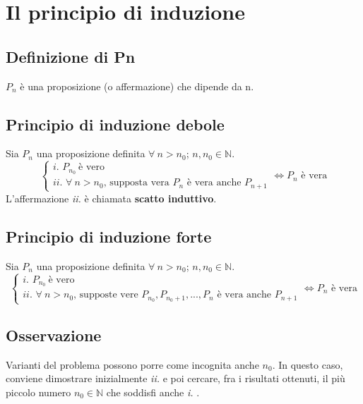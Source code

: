 \chapter{Il principio di induzione}
\section{Definizione di Pn}
$P_n$ è una proposizione (o affermazione) che dipende da n.

\section{Principio di induzione debole}
Sia $P_n$ una proposizione definita $\forall\ n>n_0$;  $n,n_0 \in \mathbb{N}$.
\begin{equation}
\begin{cases}
\textit{i. }P_{n_0}\ \text{è vero}\\
\textit{ii. }\forall\ n>n_0 \text{, supposta vera } P_n \text{ è vera anche } P_{n+1}
\end{cases} \iff P_n \text{ è vera}
\end{equation}
L'affermazione \textit{ii.} è chiamata \textbf{scatto induttivo}.

\section{Principio di induzione forte}
Sia $P_n$ una proposizione definita $\forall\ n>n_0$;  $n,n_0 \in \mathbb{N}$.
\begin{equation}
\begin{cases}
\textit{i. }P_{n_0}\ \text{è vero}\\
\textit{ii. }\forall\ n>n_0 \text{, supposte vere } P_{n_0},P_{n_0+1},...,P_n \text{ è vera anche } P_{n+1}
\end{cases} \iff P_n \text{ è vera}
\end{equation}

\section{Osservazione}
Varianti del problema possono porre come incognita anche $n_0$. In questo caso, conviene dimostrare inizialmente \textit{ii.} e poi cercare, fra i risultati ottenuti, il più piccolo numero $n_0 \in \mathbb{N}$ che soddisfi anche \textit{i.} .